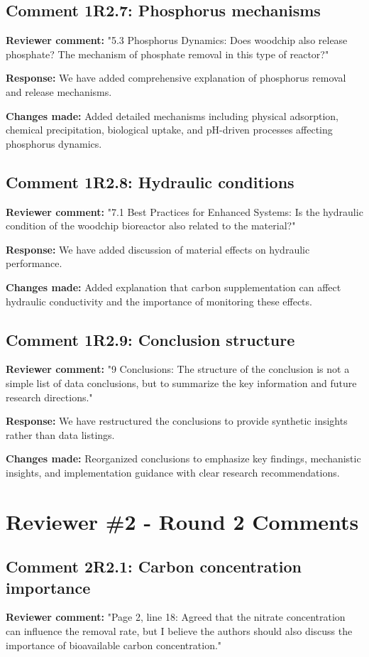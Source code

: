 \documentclass[12pt,a4paper]{article}
\begin{document}
\subsection{Comment 1R2.7: Phosphorus mechanisms}
\textbf{Reviewer comment:} "5.3 Phosphorus Dynamics: Does woodchip also release phosphate? The mechanism of phosphate removal in this type of reactor?"

\textbf{Response:} We have added comprehensive explanation of phosphorus removal and release mechanisms.

\textbf{Changes made:} Added detailed mechanisms including physical adsorption, chemical precipitation, biological uptake, and pH-driven processes affecting phosphorus dynamics.

\subsection{Comment 1R2.8: Hydraulic conditions}
\textbf{Reviewer comment:} "7.1 Best Practices for Enhanced Systems: Is the hydraulic condition of the woodchip bioreactor also related to the material?"

\textbf{Response:} We have added discussion of material effects on hydraulic performance.

\textbf{Changes made:} Added explanation that carbon supplementation can affect hydraulic conductivity and the importance of monitoring these effects.

\subsection{Comment 1R2.9: Conclusion structure}
\textbf{Reviewer comment:} "9 Conclusions: The structure of the conclusion is not a simple list of data conclusions, but to summarize the key information and future research directions."

\textbf{Response:} We have restructured the conclusions to provide synthetic insights rather than data listings.

\textbf{Changes made:} Reorganized conclusions to emphasize key findings, mechanistic insights, and implementation guidance with clear research recommendations.

\section{Reviewer \#2 - Round 2 Comments}

\subsection{Comment 2R2.1: Carbon concentration importance}
\textbf{Reviewer comment:} "Page 2, line 18: Agreed that the nitrate concentration can influence the removal rate, but I believe the authors should also discuss the importance of bioavailable carbon concentration."
\end{document}
